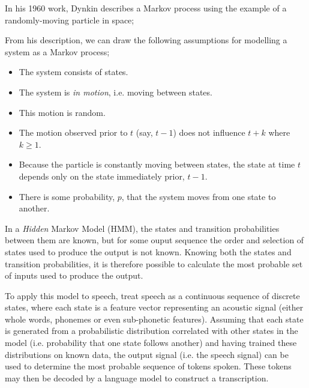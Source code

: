 In his 1960 work\cite{dynkin1960}, Dynkin describes a Markov process using the example of a randomly-moving particle in space;


From his description, we can draw the following assumptions for modelling a system as a Markov process;

\begin{itemize}
  \item The system consists of states.
  \item The system is \emph{in motion}, i.e. moving between states.
  \item This motion is random.
  \item The motion observed prior to $t$ (say, $t-1$) does not influence $t+k$ where $k \geq 1$.
  \item Because the particle is constantly moving between states, the state at time $t$ depends only on the state immediately prior, $t-1$.
  \item There is some probability, $p$, that the system moves from one state to another.
\end{itemize}

In a \emph{Hidden} Markov Model (HMM), the states and transition probabilities between them are known, but for some ouput sequence the order and selection of states used to produce the output is not known.
Knowing both the states and transition probabilities, it is therefore possible to calculate the most probable set of inputs used to produce the output.

To apply this model to speech, treat speech as a continuous sequence of discrete states, where each state is a feature vector representing an acoustic signal (either whole words, phonemes or even sub-phonetic features\cite{bengio1999markovian}).
Assuming that each state is generated from a probabilistic distribution correlated with other states in the model\cite{Rabiner1989Feb} (i.e. probability that one state follows another) and having trained these distributions on known data, the output signal (i.e. the speech signal) can be used to determine the most probable sequence of tokens spoken.
These tokens may then be decoded by a language model to construct a transcription\cite{bengio1999markovian}.

